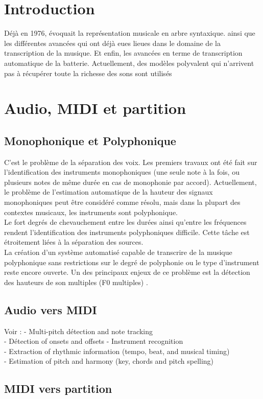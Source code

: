 \section{Introduction}
Déjà en 1976, \cite{first_one} évoquait la représentation musicale en arbre syntaxique. 
 ainsi que les différentes avancées qui ont déjà eues lieues dans le domaine de la transcription de la musique. Et enfin, les avancées en terme de transcription automatique de la batterie. Actuellement, des modèles polyvalent qui n’arrivent pas à récupérer toute la richesse des sons sont utilisés
\section{Audio, MIDI et partition}
\subsection*{Monophonique et Polyphonique}
C’est le problème de la séparation des voix.
Les premiers travaux ont été fait sur l’identification des instruments monophoniques (une seule note à la fois, ou plusieurs notes de même durée en cas de monophonie par accord). Actuellement, le problème de l'estimation automatique de la hauteur des signaux monophoniques peut être considéré comme résolu, mais dans la plupart des contextes musicaux, les instruments sont polyphonique.\\
Le fort degrés de chevauchement entre les durées ainsi qu’entre les fréquences rendent l’identification des instruments polyphoniques difficile. Cette tâche est étroitement liées à la séparation des sources.\\
La création d'un système automatisé capable de transcrire de la musique polyphonique sans restrictions sur le degré de polyphonie ou le type d'instrument reste encore ouverte. Un des principaux enjeux de ce problème est la détection des hauteurs de son multiples (F0 multiples) \cite{article1}.
\subsection*{Audio vers MIDI}
Voir : \cite{article1}
- Multi-pitch détection and note tracking\\
- Détection of onsets and offsets
- Instrument recognition\\
- Extraction of rhythmic information (tempo, beat, and musical timing)\\
- Estimation of pitch and harmony (key, chords and pitch spelling)
\subsection*{MIDI vers partition}
